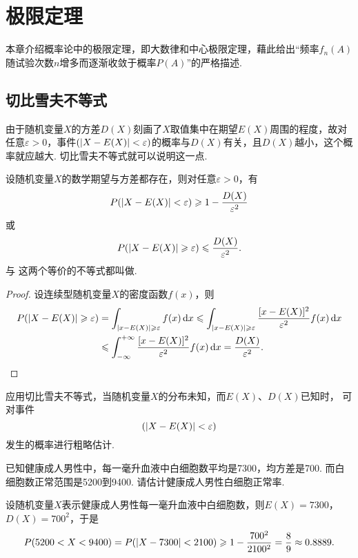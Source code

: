 \chapter{极限定理}
本章介绍概率论中的极限定理，即大数律和中心极限定理，藉此给出“频率\(f_n(A)\)随试验次数\(n\)增多而逐渐收敛于概率\(P(A)\)”的严格描述.

\section{切比雪夫不等式}
由于随机变量\(X\)的方差\(D(X)\)刻画了\(X\)取值集中在期望\(E(X)\)周围的程度，故对任意\(\varepsilon>0\)，事件\((\abs{X - E(X)} < \varepsilon)\)的概率与\(D(X)\)有关，且\(D(X)\)越小，这个概率就应越大.
切比雪夫不等式就可以说明这一点.
\begin{theorem}[切比雪夫不等式]\label{theorem:极限定理.切比雪夫不等式}
设随机变量\(X\)的数学期望与方差都存在，则对任意\(\varepsilon > 0\)，有\begin{equation}\label{equation:极限定理.切比雪夫不等式1}
P(\abs{X-E(X)}<\varepsilon) \geqslant 1 - \frac{D(X)}{\varepsilon^2}
\end{equation}或\begin{equation}\label{equation:极限定理.切比雪夫不等式2}
P(\abs{X-E(X)}\geqslant\varepsilon) \leqslant \frac{D(X)}{\varepsilon^2}.
\end{equation}  与  这两个等价的不等式都叫做.
\begin{proof}
设连续型随机变量\(X\)的密度函数\(f(x)\)，则\begin{align*}
P(\abs{X-E(X)}\geqslant\varepsilon)
&=\int_{\abs{x-E(X)}\geqslant\varepsilon} f(x) \dd{x}
\leqslant \int_{\abs{x-E(X)}\geqslant\varepsilon} \frac{[x - E(X)]^2}{\varepsilon^2} f(x) \dd{x} \\
&\leqslant \int_{-\infty}^{+\infty} \frac{[x-E(X)]^2}{\varepsilon^2} f(x) \dd{x}
=\frac{D(X)}{\varepsilon^2}.
\qedhere
\end{align*}
\end{proof}
\end{theorem}

应用切比雪夫不等式，当随机变量\(X\)的分布未知，而\(E(X)\)、\(D(X)\)已知时，%
可对事件\[
(\abs{X-E(X)}<\varepsilon)
\]发生的概率进行粗略估计.

\begin{example}
已知健康成人男性中，每一毫升血液中白细胞数平均是7300，均方差是700.
而白细胞数正常范围是5200到9400.
请估计健康成人男性白细胞正常率.
\begin{solution}
设随机变量\(X\)表示健康成人男性每一毫升血液中白细胞数，则\(E(X) = 7300\)，\(D(X) = 700^2\)，于是\[
P(5200 < X < 9400)
= P(\abs{X - 7300} < 2100)
\geqslant 1 - \frac{700^2}{2100^2} = \frac{8}{9}
\approx 0.8889.
\]
\end{solution}
\end{example}

